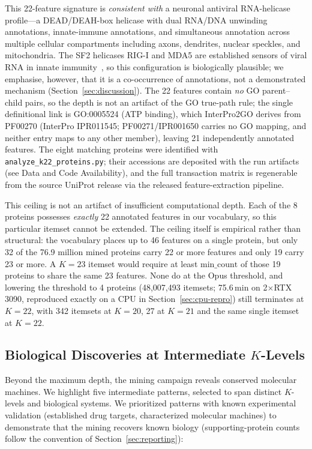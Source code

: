 \documentclass[10pt,a4paper,twocolumn]{article}
\begin{document}
This 22-feature signature is \emph{consistent with} a neuronal antiviral RNA-helicase profile---a DEAD/DEAH-box helicase with dual RNA/DNA unwinding annotations, innate-immune annotations, and simultaneous annotation across multiple cellular compartments including axons, dendrites, nuclear speckles, and mitochondria. The SF2 helicases RIG-I and MDA5 are established sensors of viral RNA in innate immunity~\cite{rehwinkel2020}, so this configuration is biologically plausible; we emphasise, however, that it is a co-occurrence of annotations, not a demonstrated mechanism (Section~\ref{sec:discussion}). The 22 features contain \emph{no} GO parent--child pairs, so the depth is not an artifact of the GO true-path rule; the single definitional link is GO:0005524 (ATP binding), which InterPro2GO derives from PF00270 (InterPro IPR011545; PF00271/IPR001650 carries no GO mapping, and neither entry maps to any other member), leaving 21 independently annotated features. The eight matching proteins were identified with \texttt{analyze\_k22\_proteins.py}; their accessions are deposited with the run artifacts (see Data and Code Availability), and the full transaction matrix is regenerable from the source UniProt release via the released feature-extraction pipeline.

This ceiling is not an artifact of insufficient computational depth. Each of the 8 proteins possesses \emph{exactly} 22 annotated features in our vocabulary, so this particular itemset cannot be extended. The ceiling itself is empirical rather than structural: the vocabulary places up to 46 features on a single protein, but only 32 of the 76.9 million mined proteins carry 22 or more features and only 19 carry 23 or more. A $K{=}23$ itemset would require at least $\text{min\_count}$ of those 19 proteins to share the same 23 features. None do at the Opus threshold, and lowering the threshold to 4 proteins (48,007,493 itemsets; 75.6\,min on 2$\times$RTX 3090, reproduced exactly on a CPU in Section~\ref{sec:cpu-repro}) still terminates at $K{=}22$, with 342 itemsets at $K{=}20$, 27 at $K{=}21$ and the same single itemset at $K{=}22$.

\subsection{Biological Discoveries at Intermediate $K$-Levels}
\label{sec:intermediate}

Beyond the maximum depth, the mining campaign reveals conserved molecular machines. We highlight five intermediate patterns, selected to span distinct $K$-levels and biological systems. We prioritized patterns with known experimental validation (established drug targets, characterized molecular machines) to demonstrate that the mining recovers known biology (supporting-protein counts follow the convention of Section~\ref{sec:reporting}):
\end{document}
